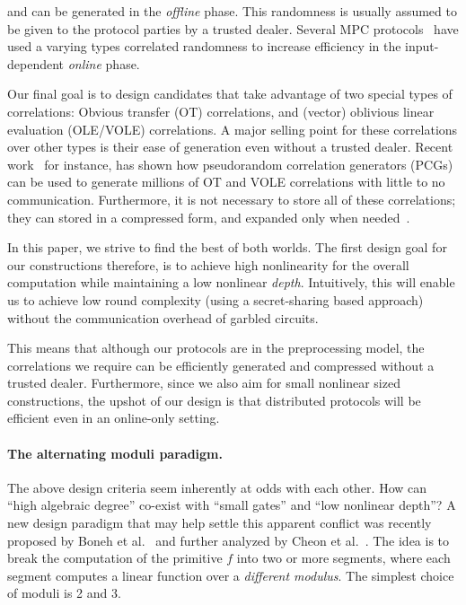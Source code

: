     and can be generated in the \textit{offline} phase. This randomness is usually assumed to be given to the protocol parties by a trusted dealer. Several MPC protocols~\cite{?} have used a varying types correlated randomness to increase efficiency in the input-dependent \textit{online} phase.

    \hspace*{1em} Our final goal is to design candidates that take advantage of two special types of correlations: Obvious transfer (OT) correlations, and (vector) oblivious linear evaluation (OLE/VOLE) correlations. A major selling point for these correlations over other types is their ease of generation even without a trusted dealer. Recent work~\cite{?} for instance, has shown how pseudorandom correlation generators (PCGs) can be used to generate millions of OT and VOLE correlations with little to no communication. Furthermore, it is not necessary to store all of these correlations; they can stored in a compressed form, and expanded only when needed~\cite{?}.


    \hspace*{1em} In this paper, we strive to find the best of both worlds. The first design goal for our constructions therefore, is to achieve high nonlinearity for the overall computation while maintaining a low nonlinear \textit{depth}. Intuitively, this will enable us to achieve low round complexity (using a secret-sharing based approach) without the communication overhead of garbled circuits.

    \hspace*{1em} This means that although our protocols are in the preprocessing model, the correlations we require can be efficiently generated and compressed without a trusted dealer. Furthermore, since we also aim for small nonlinear sized constructions, the upshot of our design is that distributed protocols will be efficient even in an online-only setting. 
\fi

\paragraph{\bf The alternating moduli paradigm.} The above design criteria seem inherently at odds with each other. How can ``high algebraic degree'' co-exist with ``small gates'' and ``low nonlinear depth''? A new design paradigm that may help settle this apparent conflict was recently proposed by Boneh et al.~\cite{boneh2018-darkmatter} and further analyzed by Cheon et al.~\cite{adventures}. The idea is to  break the computation of the primitive $f$ into two or more segments, where each segment computes a linear function over a {\em different modulus}. The simplest choice of moduli is 2 and 3. 

